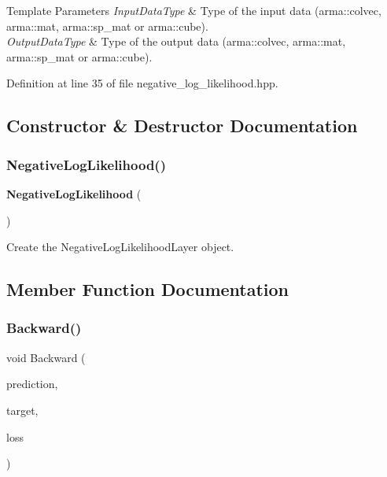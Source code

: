 \begin{DoxyTemplParams}{Template Parameters}
{\em Input\+Data\+Type} & Type of the input data (arma\+::colvec, arma\+::mat, arma\+::sp\+\_\+mat or arma\+::cube). \\
\hline
{\em Output\+Data\+Type} & Type of the output data (arma\+::colvec, arma\+::mat, arma\+::sp\+\_\+mat or arma\+::cube). \\
\hline
\end{DoxyTemplParams}


Definition at line 35 of file negative\+\_\+log\+\_\+likelihood.\+hpp.



\subsection{Constructor \& Destructor Documentation}
\mbox{\label{classmlpack_1_1ann_1_1NegativeLogLikelihood_a2c1eb2b08ec47b7097d4100d5241cb14}} 
\subsubsection{Negative\+Log\+Likelihood()}
{\footnotesize\ttfamily \textbf{ Negative\+Log\+Likelihood} (\begin{DoxyParamCaption}{ }\end{DoxyParamCaption})}



Create the Negative\+Log\+Likelihood\+Layer object. 



\subsection{Member Function Documentation}
\mbox{\label{classmlpack_1_1ann_1_1NegativeLogLikelihood_add41dbaf358dc099750dc6064cb7e0d7}} 
\subsubsection{Backward()}
{\footnotesize\ttfamily void Backward (\begin{DoxyParamCaption}\item[{const Prediction\+Type \&}]{prediction,  }\item[{const Target\+Type \&}]{target,  }\item[{Loss\+Type \&}]{loss }\end{DoxyParamCaption})}



